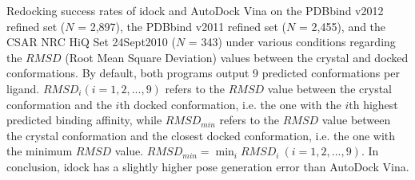 \documentclass[10pt]{article}
\begin{document}
\begin{table}[!ht]
\begin{flushleft}\label{SuccessRate} Redocking success rates of idock and AutoDock Vina on the PDBbind v2012 refined set ($N$ = 2,897), the PDBbind v2011 refined set ($N$ = 2,455), and the CSAR NRC HiQ Set 24Sept2010 ($N$ = 343) under various conditions regarding the $RMSD$ (Root Mean Square Deviation) values between the crystal and docked conformations. By default, both programs output 9 predicted conformations per ligand. $RMSD_i (i = 1,2,...,9)$ refers to the $RMSD$ value between the crystal conformation and the $i$th docked conformation, i.e. the one with the $i$th highest predicted binding affinity, while $RMSD_{min}$ refers to the $RMSD$ value between the crystal conformation and the closest docked conformation, i.e. the one with the minimum $RMSD$ value. $RMSD_{min} = \displaystyle\min_{i}RMSD_i\ (i = 1,2,...,9)$. In conclusion, idock has a slightly higher pose generation error than AutoDock Vina.
\end{flushleft}
\end{table}
\end{document}

